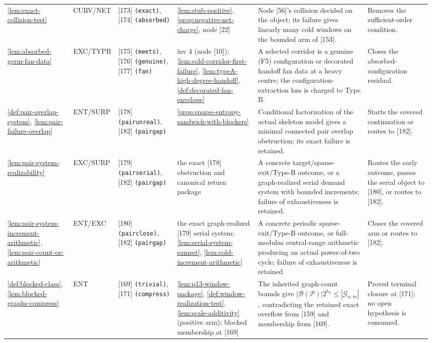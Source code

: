 \documentclass[11pt]{article}
\begin{document}
{\begin{longtable}{L{0.10\textwidth} C{0.045\textwidth} L{0.13\textwidth} L{0.135\textwidth} L{0.28\textwidth} L{0.20\textwidth}}
\cref{lem:exact-collision-test} & CURV\slash NET & [173] \texttt{(exact)}, [174] \texttt{(absorbed)} & \cref{lem:stub-positive}, \cref{prop:negative-net-charge}, node [22] & Node [56]'s collision decided on the object; its failure gives linearly many cold windows on the bounded arm of [153]. & Removes the sufficient-order condition. \\
\cref{lem:absorbed-germ-fan-data} & EXC\slash TYPB & [175] \texttt{(meets)}, [176] \texttt{(genuine)}, [177] \texttt{(fan)} & inv 4 (node [10]); \cref{lem:cold-corridor-first-failure}, \cref{lem:typeA-high-degree-handoff}, \cref{def:decorated-fan-envelope} & A selected corridor is a genuine (F5) configuration or decorated handoff fan data at a heavy centre; the configuration-extraction loss is charged to Type B. & Closes the absorbed-configuration residual. \\
\cref{def:pair-overlap-system}, \cref{lem:pair-failure-overlap} & ENT\slash SURP & [178] \texttt{(pairunreal)}, [182] \texttt{(pairgap)} & \cref{prop:sparse-entropy-sandwich-with-blockers} & Conditional factorization of the actual skeleton model gives a minimal connected pair overlap obstruction; its exact failure is retained. & Starts the covered continuation or routes to [182]. \\
\cref{lem:pair-system-realizability} & EXC\slash SURP & [179] \texttt{(pairserial)}, [182] \texttt{(pairgap)} & the exact [178] obstruction and canonical return package & A concrete target/sparse-exit/Type-B outcome, or a graph-realized serial demand system with bounded increments; failure of exhaustiveness is retained. & Routes the early outcome, passes the serial object to [180], or routes to [182]. \\
\cref{lem:pair-system-increment-arithmetic}, \cref{lem:pair-count-or-arithmetic} & ENT\slash EXC & [180] \texttt{(pairclose)}, [182] \texttt{(pairgap)} & the exact graph-realized [179] serial system; \cref{lem:serial-system-sumset}, \cref{lem:cold-increment-arithmetic} & A concrete periodic sparse-exit/Type-B outcome, or full-modulus central-range arithmetic producing an actual power-of-two cycle; failure of exhaustiveness is retained. & Closes the covered arm or routes to [182]. \\
\cref{def:blocked-class}, \cref{lem:blocked-graphs-compress} & ENT & [169] \texttt{(trivial)}, [171] \texttt{(compress)} & \cref{lem:p13-window-package}, \cref{def:window-realization-test}, \cref{lem:scale-additivity} (positive arm); blocked membership at [169] & The inherited graph-count bounds give \(|\mathcal B(\mathcal P)|2^{b_{\mathcal P}}\le|\mathcal G_{n,m}|\), contradicting the retained exact overflow from [159] and membership from [169]. & Proved terminal closure at [171]; no open hypothesis is consumed. \\

\end{longtable}}
\end{document}
